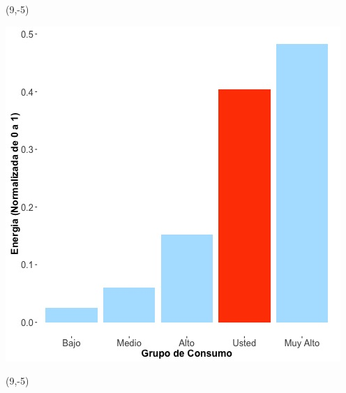 \documentclass{article}\usepackage[]{graphicx}\usepackage[]{color}
\newenvironment{knitrout}{}{} %
\begin{document}
 \begin{textblock}{1}(9,-5)
\begin{minipage}{20em}
\begingroup

\endgroup
\end{minipage}
\end{textblock}


\begin{knitrout}
\color{fgcolor}
\includegraphics[scale=0.65]{figure/A26_neighbor_plot} 
\end{knitrout}

 \begin{textblock}{1}(9,-5)
\begin{minipage}{20em}
\begingroup

\endgroup
\end{minipage}
\end{textblock}
\end{document}
